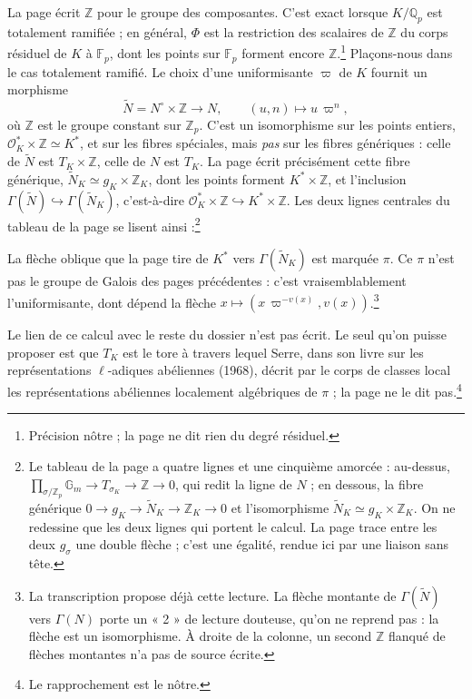 \documentclass[11pt,a4paper]{article}
\begin{document}
La page écrit $\mathbb{Z}$ pour le groupe des composantes. C'est exact lorsque
$K/\mathbb{Q}_p$ est totalement ramifiée ; en général, $\Phi$ est la
restriction des scalaires de $\mathbb{Z}$ du corps résiduel de $K$ à
$\mathbb{F}_p$, dont les points sur $\mathbb{F}_p$ forment encore
$\mathbb{Z}$.\footnote{Précision nôtre ; la page ne dit rien du degré
résiduel.} Plaçons-nous dans le cas totalement ramifié. Le choix d'une
uniformisante $\varpi$ de $K$ fournit un morphisme
\[
\tilde{N} = N^{\circ} \times \mathbb{Z} \longrightarrow N, \qquad (u, n)
\longmapsto u\,\varpi^{n},
\]
où $\mathbb{Z}$ est le groupe constant sur $\mathbb{Z}_p$. C'est un
isomorphisme sur les points entiers, $\mathcal{O}_K^{*} \times \mathbb{Z}
\simeq K^{*}$, et sur les fibres spéciales, mais \emph{pas} sur les fibres
génériques : celle de $\tilde{N}$ est $T_K \times \mathbb{Z}$, celle de $N$
est $T_K$. La page écrit précisément cette fibre générique,
$\tilde{N}_K \simeq g_K \times \mathbb{Z}_K$, dont les points forment
$K^{*} \times \mathbb{Z}$, et l'inclusion $\Gamma(\tilde{N}) \hookrightarrow
\Gamma(\tilde{N}_K)$, c'est-à-dire $\mathcal{O}_K^{*} \times \mathbb{Z}
\hookrightarrow K^{*} \times \mathbb{Z}$. Les deux lignes centrales du tableau
de la page se lisent ainsi :\footnote{Le tableau de la page a quatre lignes et
une cinquième amorcée : au-dessus, $\prod_{\sigma/\mathbb{Z}_p}\mathbb{G}_m
\to T_{\sigma_K} \to \mathbb{Z} \to 0$, qui redit la ligne de $N$ ; en
dessous, la fibre générique $0 \to g_K \to \tilde{N}_K \to \mathbb{Z}_K \to
0$ et l'isomorphisme $\tilde{N}_K \simeq g_K \times \mathbb{Z}_K$. On ne
redessine que les deux lignes qui portent le calcul. La page trace entre les
deux $g_{\sigma}$ une double flèche ; c'est une égalité, rendue ici par une
liaison sans tête.}


La flèche oblique que la page tire de $K^{*}$ vers $\Gamma(\tilde{N}_K)$ est
marquée $\pi$. Ce $\pi$ n'est pas le groupe de Galois des pages précédentes :
c'est vraisemblablement l'uniformisante, dont dépend la flèche $x \mapsto
(x\,\varpi^{-v(x)}, v(x))$.\footnote{La transcription propose déjà cette
lecture. La flèche montante de $\Gamma(\tilde{N})$ vers $\Gamma(N)$ porte un
« 2 » de lecture douteuse, qu'on ne reprend pas : la flèche est un
isomorphisme. À droite de la colonne, un second $\mathbb{Z}$ flanqué de
flèches montantes n'a pas de source écrite.}

Le lien de ce calcul avec le reste du dossier n'est pas écrit. Le seul qu'on
puisse proposer est que $T_K$ est le tore à travers lequel Serre, dans son
livre sur les représentations $\ell$-adiques abéliennes (1968), décrit par le
corps de classes local les représentations abéliennes localement algébriques
de $\pi$ ; la page ne le dit pas.\footnote{Le rapprochement est le nôtre.}
\end{document}
